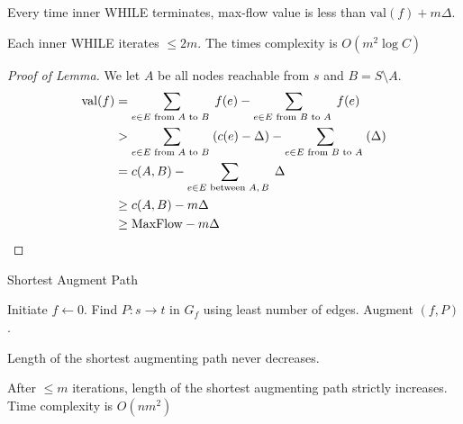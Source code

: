 
\begin{lemma}
    Every time inner WHILE terminates, max-flow value is less than  $ \mathrm{val}(f)+m\Delta $. 
\end{lemma}

\begin{corollary}
    Each inner WHILE iterates  $  \leq 2m $. The times complexity is  $ O(m^2\log C) $  
\end{corollary}
\begin{proof}[Proof of Lemma]
    We let  $ A $ be all nodes reachable from  $ s $ and  $ B=S\setminus A $.  
    \begin{align*}
        \mathrm{val}(f)&=\sum_{e\in E\text{ from $ A $ to  $ B $ }}f(e)-\sum_{e\in E\text{ from  $ B $ to  $ A $ }}f(e)\\
        &>\sum_{e\in E\text{ from $ A $ to  $ B $ }}(c(e)-\Delta)-\sum_{e\in E\text{ from  $ B $ to  $ A $ }}(\Delta)\\
        &=c(A,B)-\sum_{e\in E\text{ between  $ A,B $ }}\Delta\\
        & \geq c(A,B)-m\Delta\\
        & \geq \mathrm{MaxFlow}-m\Delta
    \end{align*}
\end{proof}


\begin{algorithm}
    \caption{Shortest Augment Path}
    \begin{algorithmic}
        \STATE Initiate $ f\leftarrow 0 $.
            \STATE Find  $ P:s\rightarrow t $ in  $ G_f $ using least number of edges.
            \STATE Augment  $ (f,P) $.   
        \ENDWHILE 
    \end{algorithmic}
\end{algorithm}
\begin{lemma}
    Length of the shortest augmenting path never decreases.
\end{lemma}
\begin{lemma}\label{shortest augment path lemma -strongest version}
    After  $   \leq  m$ iterations, length of the shortest augmenting path strictly increases. Time complexity is  $ O(nm^2) $ 
\end{lemma}

